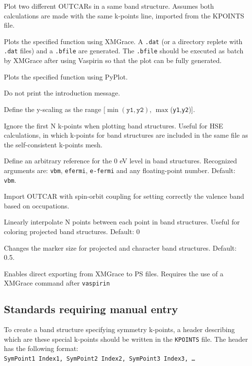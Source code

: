 \documentclass{refart}
\begin{document}
 Plot two different OUTCARs in a same band structure. Assumes both calculations are made with the same k-points line, imported from the KPOINTS file.

 Plots the specified function using XMGrace. A \texttt{.dat} (or a directory replete with \texttt{.dat} files) and a \texttt{.bfile} are generated. The \texttt{.bfile} should be executed as batch by XMGrace after using Vaspirin so that the plot can be fully generated.

 Plots the specified function using PyPlot.

 Do not print the introduction message.

 Define the y-scaling as the range [$\min(\texttt{y1},\texttt{y2})$, $\max$(\texttt{y1},\texttt{y2})].

 Ignore the first N k-points when plotting band structures. Useful for HSE calculations, in which k-points for band structures are included in the same file as the self-consistent k-points mesh.

 Define an arbitrary reference for the 0 eV level in band structures. Recognized arguments are: \texttt{vbm}, \texttt{efermi}, \texttt{e-fermi} and any floating-point number. Default: \texttt{vbm}.

 Import OUTCAR with spin-orbit coupling for setting correctly the valence band based on occupations.

 Linearly interpolate N points between each point in band structures. Useful for coloring projected band structures. Default: 0

 Changes the marker size for projected and character band structures. Default: 0.5.

 Enables direct exporting from XMGrace to PS files. Requires the use of a XMGrace command after \texttt{vaspirin}



\subsection{Standards requiring manual entry}\label{sec:projection}

 To create a band structure specifying symmetry k-points, a header describing which are these special k-points should be written in the \texttt{KPOINTS} file. The header has the following format:\\
\texttt{SymPoint1 Index1, SymPoint2 Index2, SymPoint3 Index3, \ldots}
\end{document}
